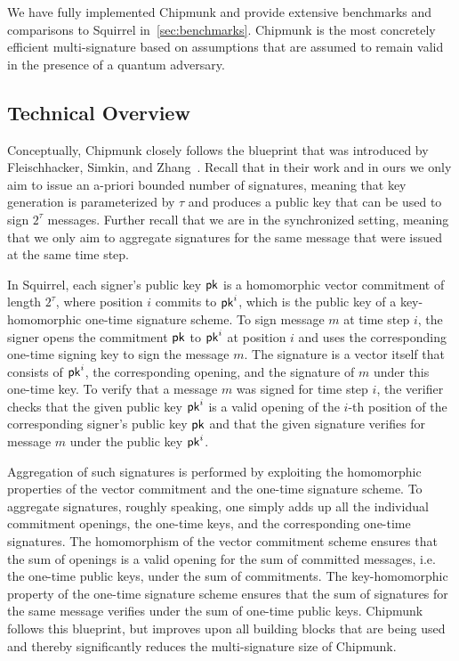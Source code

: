 We have fully implemented Chipmunk and provide extensive benchmarks and comparisons to Squirrel in~\autoref{sec:benchmarks}.
Chipmunk is the most concretely efficient multi-signature based on assumptions that are assumed to remain valid in the presence of a quantum adversary.

\subsection{Technical Overview}

Conceptually, Chipmunk closely follows the blueprint that was introduced by Fleischhacker, Simkin, and Zhang~\cite{CCS:FleSimZha22}.
Recall that in their work and in ours we only aim to issue an a-priori bounded number of signatures, meaning that key generation is parameterized by $\tau$ and produces a public key that can be used to sign $2^\tau$ messages.
Further recall that we are in the synchronized setting, meaning that we only aim to aggregate signatures for the same message that were issued at the same time step.

In Squirrel, each signer's public key $\mathsf{pk}$ is a homomorphic vector commitment of length $2^\tau$, where position $i$ commits to $\mathsf{pk}^i$, which is the public key of a key-homomorphic one-time signature scheme.
To sign message $m$ at time step $i$, the signer opens the commitment $\mathsf{pk}$ to $\mathsf{pk}^i$ at position $i$ and uses the corresponding one-time signing key to sign the message $m$.
The signature is a vector itself that consists of $\mathsf{pk}^i$, the corresponding opening, and the signature of $m$ under this one-time key.
To verify that a message $m$ was signed for time step $i$, the verifier checks that the given public key $\mathsf{pk}^i$ is a valid opening of the $i$-th position of the corresponding signer's public key $\mathsf{pk}$ and that the given signature verifies for message $m$ under the public key $\mathsf{pk}^i$.

Aggregation of such signatures is performed by exploiting the homomorphic properties of the vector commitment and the one-time signature scheme.
To aggregate signatures, roughly speaking, one simply adds up all the individual commitment openings, the one-time keys, and the corresponding one-time signatures.
The homomorphism of the vector commitment scheme ensures that the sum of openings is a valid opening for the sum of committed messages, i.e. the one-time public keys, under the sum of commitments.
The key-homomorphic property of the one-time signature scheme ensures that the sum of signatures for the same message verifies under the sum of one-time public keys.
Chipmunk follows this blueprint, but improves upon all building blocks that are being used and thereby significantly reduces the multi-signature size of Chipmunk.

